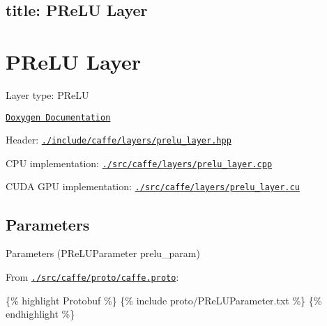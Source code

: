 

 \subsection*{title\+: P\+Re\+LU Layer }

\section*{P\+Re\+LU Layer}


\begin{DoxyItemize}
\item Layer type\+: {\ttfamily P\+Re\+LU}
\item \href{http://caffe.berkeleyvision.org/doxygen/classcaffe_1_1PReLULayer.html}{\tt Doxygen Documentation}
\item Header\+: \href{https://github.com/BVLC/caffe/blob/master/include/caffe/layers/prelu_layer.hpp}{\tt {\ttfamily ./include/caffe/layers/prelu\+\_\+layer.hpp}}
\item C\+PU implementation\+: \href{https://github.com/BVLC/caffe/blob/master/src/caffe/layers/prelu_layer.cpp}{\tt {\ttfamily ./src/caffe/layers/prelu\+\_\+layer.cpp}}
\item C\+U\+DA G\+PU implementation\+: \href{https://github.com/BVLC/caffe/blob/master/src/caffe/layers/prelu_layer.cu}{\tt {\ttfamily ./src/caffe/layers/prelu\+\_\+layer.cu}}
\end{DoxyItemize}

\subsection*{Parameters}


\begin{DoxyItemize}
\item Parameters ({\ttfamily P\+Re\+L\+U\+Parameter prelu\+\_\+param})
\item From \href{https://github.com/BVLC/caffe/blob/master/src/caffe/proto/caffe.proto}{\tt {\ttfamily ./src/caffe/proto/caffe.proto}}\+:
\end{DoxyItemize}

\{\% highlight Protobuf \%\} \{\% include proto/\+P\+Re\+L\+U\+Parameter.\+txt \%\} \{\% endhighlight \%\} 